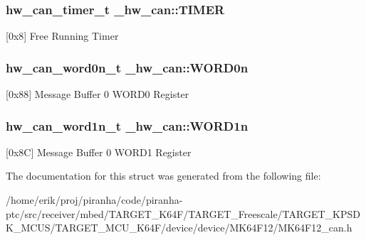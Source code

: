 \subsubsection[{\texorpdfstring{T\+I\+M\+ER}{TIMER}}]{ {\bf hw\+\_\+can\+\_\+timer\+\_\+t} \+\_\+hw\+\_\+can\+::\+T\+I\+M\+ER}\hypertarget{struct__hw__can_a6b9ebca85da0babbf3ce0612d69b4191}{}\label{struct__hw__can_a6b9ebca85da0babbf3ce0612d69b4191}
\mbox{[}0x8\mbox{]} Free Running Timer 
\subsubsection[{\texorpdfstring{W\+O\+R\+D0n}{WORD0n}}]{ {\bf hw\+\_\+can\+\_\+word0n\+\_\+t} \+\_\+hw\+\_\+can\+::\+W\+O\+R\+D0n}\hypertarget{struct__hw__can_ac45bd7bae4f7f7c7890ab95b0475b052}{}\label{struct__hw__can_ac45bd7bae4f7f7c7890ab95b0475b052}
\mbox{[}0x88\mbox{]} Message Buffer 0 W\+O\+R\+D0 Register 
\subsubsection[{\texorpdfstring{W\+O\+R\+D1n}{WORD1n}}]{ {\bf hw\+\_\+can\+\_\+word1n\+\_\+t} \+\_\+hw\+\_\+can\+::\+W\+O\+R\+D1n}\hypertarget{struct__hw__can_a26e15ce0a4341add8e4b48a697b6d45d}{}\label{struct__hw__can_a26e15ce0a4341add8e4b48a697b6d45d}
\mbox{[}0x8C\mbox{]} Message Buffer 0 W\+O\+R\+D1 Register 

The documentation for this struct was generated from the following file\+:\begin{DoxyCompactItemize}
\item 
/home/erik/proj/piranha/code/piranha-\/ptc/src/receiver/mbed/\+T\+A\+R\+G\+E\+T\+\_\+\+K64\+F/\+T\+A\+R\+G\+E\+T\+\_\+\+Freescale/\+T\+A\+R\+G\+E\+T\+\_\+\+K\+P\+S\+D\+K\+\_\+\+M\+C\+U\+S/\+T\+A\+R\+G\+E\+T\+\_\+\+M\+C\+U\+\_\+\+K64\+F/device/device/\+M\+K64\+F12/M\+K64\+F12\+\_\+can.\+h\end{DoxyCompactItemize}
